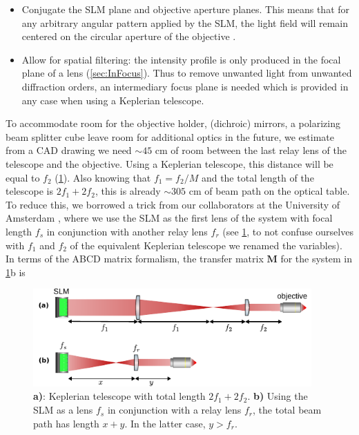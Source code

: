 \begin{itemize}
    \item Conjugate the SLM plane and objective aperture planes.
    This means that for any arbitrary angular pattern applied by the SLM, the light field will remain centered on the circular aperture of the objective \cite{Nogrette2014}. 
    
    \item Allow for spatial filtering: the intensity profile is only produced in the focal plane of a lens (\cref{sec:InFocus}).
    Thus to remove unwanted light from unwanted diffraction orders, an intermediary focus plane is needed which is provided in any case when using a Keplerian telescope.
\end{itemize}
To accommodate room for the objective holder, (dichroic) mirrors, a polarizing beam splitter cube leave room for additional optics in the future, we estimate from a CAD drawing we need $\sim 45$ cm of room between the last relay lens of the telescope and the objective. 
Using a Keplerian telescope, this distance will be equal to $f_2$ (\cref{fig:SLMbeampath}).
Also knowing that $f_1=f_2/M$ and the total length of the telescope is $2f_1+2f_2$, this is already $\sim 305$ cm of beam path on the optical table. 
To reduce this, we borrowed a trick from our collaborators at the University of Amsterdam \cite{Urech2022}, where we use the SLM as the first lens of the system with focal length $f_s$ in conjunction with another relay lens $f_r$ (see \cref{fig:SLMbeampath}, to not confuse ourselves with $f_1$ and $f_2$ of the equivalent Keplerian telescope we renamed the variables). 
In terms of the ABCD matrix formalism, the transfer matrix $\mathbf{M}$ for the system in \cref{fig:SLMbeampath}b is

\begin{figure}
	\centering
	\includegraphics[width=0.95\textwidth]{figures/beampathSLM.pdf}
	\caption{\textsf{\textbf{a)}}: Keplerian telescope with total length $2f_1+2f_2$. \textsf{\textbf{b)}} Using the SLM as a lens $f_s$ in conjunction with a relay lens $f_r$, the total beam path has length $x+y$. In the latter case, $y>f_r$.}
	\label{fig:SLMbeampath}
\end{figure}

